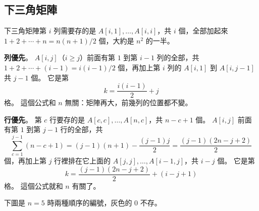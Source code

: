 \subsection{下三角矩陣}

下三角矩陣第 $i$ 列需要存的是 $A[i, 1], \ldots, A[i, i]$，共 $i$ 個，全部加起來
$1 + 2 + \cdots + n = n(n + 1)/2$ 個，大約是 $n^2$ 的一半。

\textbf{列優先}。 $A[i, j]$（$i \ge j$）前面有第 $1$ 到第 $i - 1$ 列的全部，共
$1 + 2 + \cdots + (i - 1) = i(i - 1)/2$ 個，再加上第 $i$ 列的 $A[i, 1]$ 到
$A[i, j - 1]$ 共 $j - 1$ 個。 它是第
\begin{equation}
k = \frac{i(i - 1)}{2} + j
\label{eq:arr-lower-row}
\end{equation}
格。 這個公式和 $n$ 無關：矩陣再大，前幾列的位置都不變。

\textbf{行優先}。 第 $c$ 行要存的是 $A[c, c], \ldots, A[n, c]$，共 $n - c + 1$ 個。
$A[i, j]$ 前面有第 $1$ 到第 $j - 1$ 行的全部，共
\[
\sum_{c=1}^{j-1} (n - c + 1) = (j - 1)(n + 1) - \frac{(j - 1)j}{2}
= \frac{(j - 1)(2n - j + 2)}{2}
\]
個，再加上第 $j$ 行裡排在它上面的 $A[j, j], \ldots, A[i - 1, j]$，共 $i - j$ 個。
它是第
\begin{equation}
k = \frac{(j - 1)(2n - j + 2)}{2} + (i - j + 1)
\label{eq:arr-lower-col}
\end{equation}
格。 這個公式就和 $n$ 有關了。

下圖是 $n = 5$ 時兩種順序的編號，灰色的 $0$ 不存。

